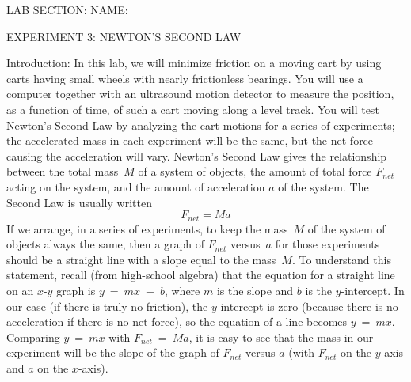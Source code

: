 
\baselineskip=15pt
\vglue-0.7in
\hglue-2.0cm LAB SECTION:
\underbar{~~~~~~~~~~~~~~~~~~~~~~~~~~~~~~~~~~~~~~~~~~~~~~}
 NAME:
\rlap{
\underbar{~~~~~~~~~~~~~~~~~~~~~~~~~~~~~~~~~~~~~~~~~~~~~~}
}
\bigskip
\bigskip
\bigskip
\centerline{EXPERIMENT 3: NEWTON'S SECOND LAW}
\bigskip
Introduction:  In this lab, we will minimize friction on a
moving cart by using carts having small wheels with nearly
frictionless bearings.  You will use a computer together 
with an ultrasound motion detector to measure the position, 
as a function of time, of such a cart moving along a level
track.  You will test Newton's Second Law by analyzing the 
cart motions for a series of experiments; the accelerated 
mass in each experiment will be the same, but the net force 
causing the acceleration will vary.
\bigskip
  Newton's Second Law gives the relationship between the total
mass~$M$ of a system of objects, the amount of total force $F_{net}$
acting on the system, and the amount of acceleration $a$ of the 
system.  The Second Law is usually written
$$F_{net} = Ma $$
\noindent If we arrange, in a series of experiments, to keep the 
mass~$M$ of the system of objects always the same, then a graph of 
$F_{net}$ versus~$a$ for those experiments should be a straight line 
with a slope equal to the mass~$M$.  To understand this statement, 
recall (from high-school algebra) that the equation for a straight 
line on an $x$-$y$ graph is $y$~=~$m$$x$~+~$b$, where $m$ is the 
slope and $b$ is the $y$-intercept.  In our case (if there is truly 
no friction), the $y$-intercept is zero (because there is no 
acceleration if there is no net force), so the equation of a line
becomes $y$~=~$m$$x$.  Comparing $y$~=~$m$$x$ with $F_{net}$~=~$M$$a$,
it is easy to see that the mass in our experiment will be the slope 
of the graph of $F_{net}$ versus $a$ (with $F_{net}$ on the $y$-axis
and $a$ on the $x$-axis).  

\smallskip
{}   

